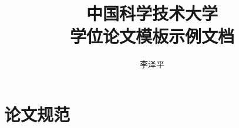 \documentclass[doctor]{ustcthesis}
\title{中国科学技术大学\\学位论文模板示例文档}
\author{李泽平}
\begin{document}
%

\maketitle
\makestatement

\frontmatter

\tableofcontents


\mainmatter






\appendix
\chapter{论文规范}

\backmatter


\end{document}
